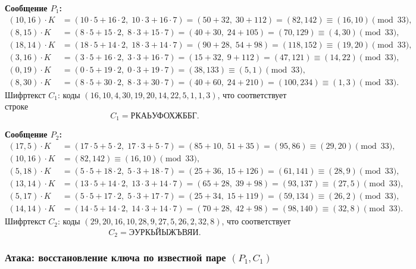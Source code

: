 \noindent\textbf{Сообщение $P_1$:}
\[
\begin{aligned}
(10,16) \cdot K &= (10\cdot 5 + 16\cdot 2,\; 10\cdot 3 + 16\cdot 7) = (50+32,\; 30+112) = (82, 142) \equiv (16, 10) \pmod{33},\\
(8,15) \cdot K &= (8\cdot 5 + 15\cdot 2,\; 8\cdot 3 + 15\cdot 7) = (40+30,\; 24+105) = (70, 129) \equiv (4, 30) \pmod{33},\\
(18,14) \cdot K &= (18\cdot 5 + 14\cdot 2,\; 18\cdot 3 + 14\cdot 7) = (90+28,\; 54+98) = (118, 152) \equiv (19, 20) \pmod{33},\\
(3,16) \cdot K &= (3\cdot 5 + 16\cdot 2,\; 3\cdot 3 + 16\cdot 7) = (15+32,\; 9+112) = (47, 121) \equiv (14, 22) \pmod{33},\\
(0,19) \cdot K &= (0\cdot 5 + 19\cdot 2,\; 0\cdot 3 + 19\cdot 7) = (38, 133) \equiv (5, 1) \pmod{33},\\
(8,30) \cdot K &= (8\cdot 5 + 30\cdot 2,\; 8\cdot 3 + 30\cdot 7) = (40+60,\; 24+210) = (100, 234) \equiv (1, 3) \pmod{33}.
\end{aligned}
\]
Шифртекст $C_1$: коды $(16,10,4,30,19,20,14,22,5,1,1,3)$, что соответствует строке
\[
C_1 = \texttt{РКАЬУФОХЖББГ}.
\]

\noindent\textbf{Сообщение $P_2$:}
\[
\begin{aligned}
(17,5) \cdot K &= (17\cdot 5 + 5\cdot 2,\; 17\cdot 3 + 5\cdot 7) = (85+10,\; 51+35) = (95, 86) \equiv (29, 20) \pmod{33},\\
(10,16) \cdot K &= (82, 142) \equiv (16, 10) \pmod{33},\\
(5,18) \cdot K &= (5\cdot 5 + 18\cdot 2,\; 5\cdot 3 + 18\cdot 7) = (25+36,\; 15+126) = (61, 141) \equiv (28, 9) \pmod{33},\\
(13,14) \cdot K &= (13\cdot 5 + 14\cdot 2,\; 13\cdot 3 + 14\cdot 7) = (65+28,\; 39+98) = (93, 137) \equiv (27, 5) \pmod{33},\\
(5,17) \cdot K &= (5\cdot 5 + 17\cdot 2,\; 5\cdot 3 + 17\cdot 7) = (25+34,\; 15+119) = (59, 134) \equiv (26, 2) \pmod{33},\\
(14,14) \cdot K &= (14\cdot 5 + 14\cdot 2,\; 14\cdot 3 + 14\cdot 7) = (70+28,\; 42+98) = (98, 140) \equiv (32, 8) \pmod{33}.
\end{aligned}
\]
Шифртекст $C_2$: коды $(29,20,16,10,28,9,27,5,26,2,32,8)$, что соответствует
\[
C_2 = \texttt{ЭУРКЬЙЫЖЪВЯИ}.
\]

\subsubsection{Атака: восстановление ключа по известной паре $(P_1, C_1)$}

